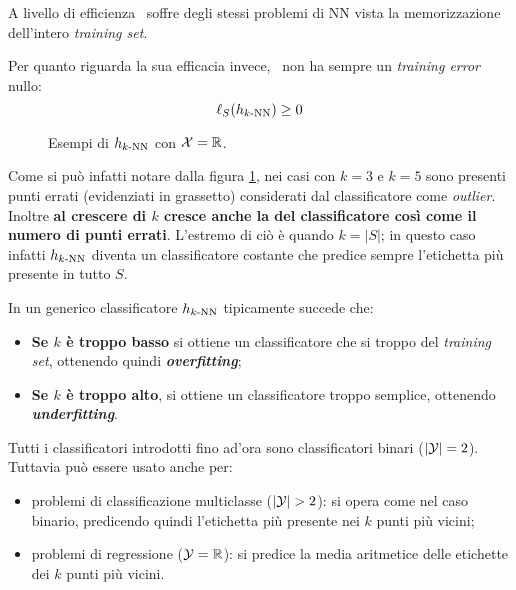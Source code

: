 A livello di efficienza \kNN \ soffre degli stessi problemi di NN vista la
memorizzazione dell'intero \textit{training set}.

Per quanto riguarda la sua efficacia invece, \kNN \ non ha sempre un 
\textit{training error} nullo:
$$ \ell_S(h_{k\text{-NN}})\geq0 $$

\begin{figure}[h]
    \centering
    
    \caption{\label{fig:knn_line}Esempi di $h_{k\text{-NN}}$ con $\mathcal{X} = \mathbb{R}$.}
\end{figure}
\vspace{1em}

Come si può infatti notare dalla figura \ref{fig:knn_line}, nei casi con $k=3$ e 
$k=5$ sono presenti punti errati (evidenziati in grassetto) considerati dal 
classificatore come \textit{outlier}. Inoltre \textbf{al crescere di $k$ cresce 
anche la  del classificatore così come il numero di punti errati}.
L'estremo di ciò è quando $k=|S|$; in questo caso infatti $h_{k\text{-NN}}$ diventa un 
classificatore costante che predice sempre l'etichetta più presente in tutto $S$.

In un generico classificatore $h_{k\text{-NN}}$ tipicamente succede che:
\begin{itemize}
    \item \textbf{Se $k$ è troppo basso} si ottiene un classificatore che si 
         troppo del \textit{training set}, ottenendo quindi 
        \textbf{\textit{overfitting}};
    \item \textbf{Se $k$ è troppo alto}, si ottiene un classificatore troppo
        semplice, ottenendo \textbf{\textit{underfitting}}.
\end{itemize}

Tutti i classificatori introdotti fino ad'ora sono classificatori binari ($|\mathcal{Y}|=2$).
Tuttavia \kNN può essere usato anche per:
\begin{itemize}
    \item problemi di classificazione multiclasse ($|\Y|>2$): si opera come nel caso
        binario, predicendo quindi l'etichetta più presente nei $k$ punti più vicini;
    \item problemi di regressione ($\mathcal{Y} = \mathbb{R}$): si predice la media aritmetice delle
        etichette dei $k$ punti più vicini.
\end{itemize}